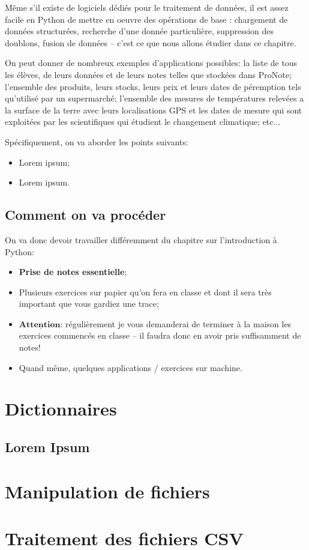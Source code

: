 \documentclass[12pt]{article}
\begin{document}
	Même s'il existe de logiciels dédiés pour le traitement de données, il est assez facile en Python de mettre en oeuvre des opérations de base : chargement de données structurées, recherche d'une donnée particulière, suppression des doublons, fusion de données -- c'est ce que nous allons étudier dans ce chapitre.
	
	On peut donner de nombreux exemples d'applications possibles: la liste de tous les élèves, de leurs données et de leurs notes telles que stockées dans ProNote; l'ensemble des produits, leurs stocks, leurs prix et leurs dates de péremption tels qu'utilisé par un supermarché; l'ensemble des mesures de températures relevées a la surface de la terre avec leurs localisations GPS et les dates de mesure qui sont exploitées par les scientifiques qui étudient le changement climatique; etc...
		
	Spécifiquement, on va aborder les points suivants:
	\begin{itemize}
		\item Lorem ipsum;
		\item Lorem ipsum.
	\end{itemize}
	
	\subsection{Comment on va procéder}
	\lipsum[1]

	\vspace{\baselineskip}
	On va donc devoir travailler différemment du chapitre sur l'introduction à Python:
	 \begin{itemize}
	 	\item \textbf{Prise de notes essentielle};
	 	\item Plusieurs exercices sur papier qu'on fera en classe et dont il sera très important que vous gardiez une trace;
	 	\item $\underline{\textbf{Attention:}}$ régulièrement je vous demanderai de terminer à la maison les exercices commencés en classe -- il faudra donc en avoir pris suffisamment de notes!
	 	\item Quand même, quelques applications / exercices sur machine.
	 \end{itemize}
	 
	 \pagebreak
	 
	 \section{Dictionnaires}
	 
	 
	 \subsection{Lorem Ipsum}
	 \lipsum[1]
	 
	 \pagebreak
	 
	 \section{Manipulation de fichiers}
	 \lipsum[1]

	\pagebreak
	
	\section{Traitement des fichiers CSV}
	\lipsum[1]
	
	\pagebreak
	
	
\end{document}
